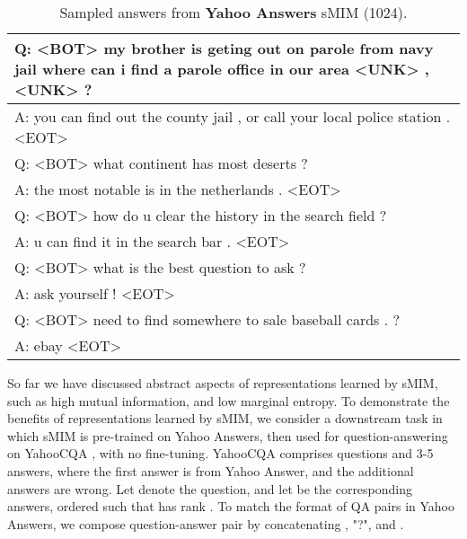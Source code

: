 \documentclass{article}
\begin{document}
\begin{table}[t]
    \centering
    \setlength{\tabcolsep}{0.5em} {\scriptsize
    \renewcommand{\arraystretch}{1.2}\begin{tabular}{p{8cm}}
         \hline
        \rowcolor{Gray}
Q: \textsc{<BOT>} my brother is geting out on parole from navy jail where can i find a parole office in our area \textsc{<UNK>} , \textsc{<UNK>} ? \\
\hline
A: you can find out the county jail , or call your local police station . \textsc{<EOT>} \\
\hline
\hline
        \rowcolor{Gray}
Q: \textsc{<BOT>} what continent has most deserts ? \\
\hline
A: the most notable is in the netherlands . \textsc{<EOT>} \\
\hline
\hline
        \rowcolor{Gray}
Q: \textsc{<BOT>} how do u clear the history in the search field ? \\
\hline
A:  u can find it in the search bar . \textsc{<EOT>} \\
\hline
\hline
        \rowcolor{Gray}
Q: \textsc{<BOT>} what is the best question to ask ? \\
\hline
A: ask yourself ! \textsc{<EOT>} \\
\hline
\hline
        \rowcolor{Gray}
Q: \textsc{<BOT>} need to find somewhere to sale baseball cards . ? \\
\hline
A: ebay \textsc{<EOT>} \\
\hline
\hline
\end{tabular}
    }
        \vspace*{-0.1cm}
    \caption{
    Sampled answers from \textbf{Yahoo Answers} sMIM (1024).
    }
    \label{tab:question-answering-samples}
    \vspace*{-0.1cm}
\end{table}

So far we have discussed abstract aspects of representations learned by sMIM, such as high mutual information, and low marginal entropy.
To demonstrate the benefits of representations learned by sMIM, we consider a downstream task in which sMIM is 
pre-trained on Yahoo Answers, then used for question-answering on YahooCQA 
\citep{DBLP:conf/sigir/TayPLH17}, with no fine-tuning. 
YahooCQA comprises questions and 3-5 answers, where the first answer is from Yahoo Answer, 
and the additional answers are wrong.
Let  denote the  question, and let  be the  
corresponding answers, ordered such that  has rank .
To match the format of QA pairs in Yahoo Answers, we compose question-answer 
pair   by concatenating , "?", and .
\end{document}
